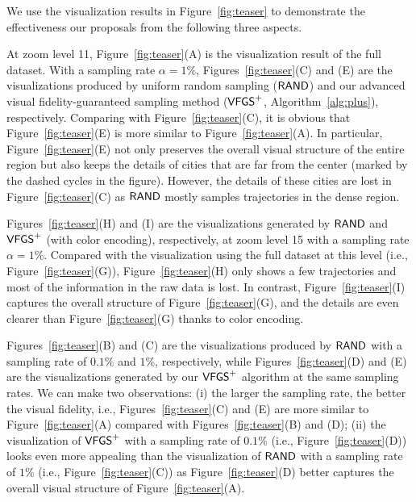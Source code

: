 We use the visualization results in Figure~\ref{fig:teaser} to demonstrate the effectiveness our proposals from the following three aspects.


At zoom level 11, Figure~\ref{fig:teaser}(A) is the visualization result of the full \pt{} dataset.
With a sampling rate $\alpha \!=\! 1\%$, Figures~\ref{fig:teaser}(C) and (E) are the visualizations produced by uniform random sampling ($\mathsf{RAND}$)
and our advanced visual fidelity-guaranteed sampling method ($\mathsf{VFGS}^{+}$, Algorithm~\ref{alg:plus}), respectively. Comparing with Figure~\ref{fig:teaser}(C), it is obvious that Figure~\ref{fig:teaser}(E) is more similar to Figure~\ref{fig:teaser}(A). In particular, Figure~\ref{fig:teaser}(E) not only preserves the overall visual structure of the entire region but also keeps the details of cities that are far from the center (marked by the dashed cycles in the figure). However, the details of these cities are lost in Figure~\ref{fig:teaser}(C) as $\mathsf{RAND}{}$ mostly samples trajectories in the dense region.

Figures~\ref{fig:teaser}(H) and (I) are the visualizations generated by $\mathsf{RAND}$ and $\mathsf{VFGS}^{+}$  (with color encoding), respectively, at zoom level 15 with a sampling rate $\alpha=1\%$.
Compared with the visualization using the full dataset at this level (i.e., Figure~\ref{fig:teaser}(G)), Figure~\ref{fig:teaser}(H) only shows a few trajectories and most of the information in the raw data is lost. In contrast, Figure~\ref{fig:teaser}(I) captures the overall structure of Figure~\ref{fig:teaser}(G), and the details are even clearer than Figure~\ref{fig:teaser}(G) thanks to color encoding.


Figures~\ref{fig:teaser}(B) and (C) are the visualizations produced by $\mathsf{RAND}{}$ with a sampling rate of $0.1\%$ and $1\%$, respectively, while Figures~\ref{fig:teaser}(D) and (E) are the visualizations generated by our $\mathsf{VFGS}^{+}{}$ algorithm at the same sampling rates. We can make two observations: (i) the larger the sampling rate, the better the visual fidelity, i.e., Figures~\ref{fig:teaser}(C) and (E) are more similar to Figure~\ref{fig:teaser}(A) compared with Figures~\ref{fig:teaser}(B) and (D); (ii) the visualization of $\mathsf{VFGS}^{+}$ with a sampling rate of $0.1\%$ (i.e., Figure~\ref{fig:teaser}(D)) looks even more appealing than the visualization of $\mathsf{RAND}{}$ with a sampling rate of $1\%$ (i.e., Figure~\ref{fig:teaser}(C)) as Figure~\ref{fig:teaser}(D) better captures the overall visual structure of Figure~\ref{fig:teaser}(A).

